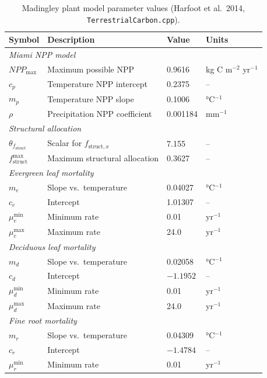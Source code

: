 \documentclass[12pt]{article}
\begin{document}
\begin{table}[ht]
\centering
\caption{Madingley plant model parameter values (Harfoot et al.\ 2014,
         \texttt{TerrestrialCarbon.cpp}).}
\label{tab:params}
\begin{tabular}{llll}
\toprule
Symbol & Description & Value & Units \\
\midrule
\multicolumn{4}{l}{\textit{Miami NPP model}} \\
$\mathit{NPP}_{\max}$ & Maximum possible NPP & 0.9616 & kg C m$^{-2}$ yr$^{-1}$ \\
$c_p$                 & Temperature NPP intercept & 0.2375 & -- \\
$m_p$                 & Temperature NPP slope & 0.1006 & °C$^{-1}$ \\
$\rho$                & Precipitation NPP coefficient & 0.001184 & mm$^{-1}$ \\
\midrule
\multicolumn{4}{l}{\textit{Structural allocation}} \\
$\theta_{f_{\mathrm{struct}}}$ & Scalar for $f_{\mathrm{struct},x}$ & 7.155 & -- \\
$f^{\max}_{\mathrm{struct}}$   & Maximum structural allocation & 0.3627 & -- \\
\midrule
\multicolumn{4}{l}{\textit{Evergreen leaf mortality}} \\
$m_e$                 & Slope vs.\ temperature & 0.04027 & °C$^{-1}$ \\
$c_e$                 & Intercept & 1.01307 & -- \\
$\mu^{\min}_{e}$      & Minimum rate & 0.01 & yr$^{-1}$ \\
$\mu^{\max}_{e}$      & Maximum rate & 24.0 & yr$^{-1}$ \\
\midrule
\multicolumn{4}{l}{\textit{Deciduous leaf mortality}} \\
$m_d$                 & Slope vs.\ temperature & 0.02058 & °C$^{-1}$ \\
$c_d$                 & Intercept & $-1.1952$ & -- \\
$\mu^{\min}_{d}$      & Minimum rate & 0.01 & yr$^{-1}$ \\
$\mu^{\max}_{d}$      & Maximum rate & 24.0 & yr$^{-1}$ \\
\midrule
\multicolumn{4}{l}{\textit{Fine root mortality}} \\
$m_r$                 & Slope vs.\ temperature & 0.04309 & °C$^{-1}$ \\
$c_r$                 & Intercept & $-1.4784$ & -- \\
$\mu^{\min}_{r}$      & Minimum rate & 0.01 & yr$^{-1}$ \\

\end{tabular}
\end{table}
\end{document}
